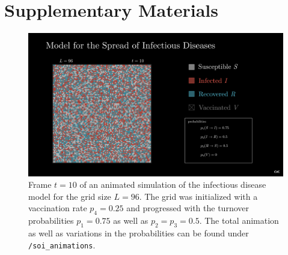 \section{Supplementary Materials}


\begin{figure}[ht]
    \centering
    \includegraphics[width=1\textwidth]{images/soi_main_scene_75_50_50_25_t10.png}
    \caption{Frame $t=10$ of an animated simulation of the infectious disease model for the grid size $L=96$. The grid was initialized with a vaccination rate $p_4=0.25$ and progressed with 
    the turnover probabilities $p_1=0.75$ as well as $p_2=p_3=0.5$. The total animation as well as variations in the probabilities can be found under \texttt{/soi\_animations}.}\label{fig:Animation_Inf_t}
\end{figure}